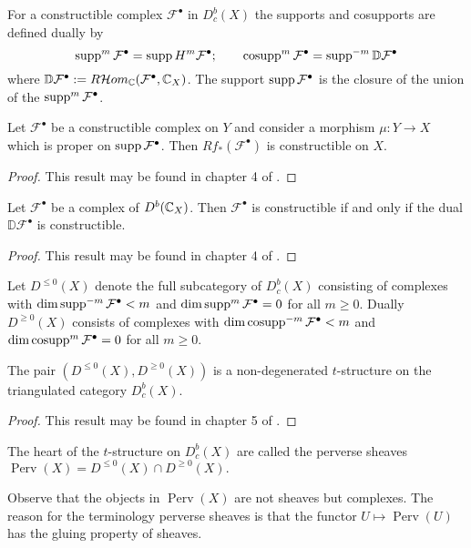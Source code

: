   For a constructible complex $\mathcal{F}^\bullet$ in $D^b_c(X)$ the supports and cosupports are defined dually by
  $$\operatorname{supp}^m\mathcal{F}^\bullet = \operatorname{supp} H^m \mathcal{F}^\bullet; \qquad \operatorname{cosupp}^m\mathcal{F}^\bullet = \operatorname{supp}^{-m}\mathbb{D}\mathcal{F}^\bullet$$
  where $\mathbb{D}\mathcal{F}^\bullet := R \mathcal{H}om_{\mathbb{C}}(\mathcal{F}^\bullet,\mathbb{C}_X)$.
  The support $\operatorname{supp} \mathcal{F}^\bullet$ is the closure of the union of the $\operatorname{supp}^m\mathcal{F}^\bullet$.
  \begin{theorem}
    Let $\mathcal{F}^\bullet$ be a constructible complex on $Y$ and consider a morphism $\mu:Y\to X$ which is proper on $\operatorname{supp} \mathcal{F}^\bullet$. Then $Rf_*(\mathcal{F}^\bullet)$ is constructible on $X$.
  \end{theorem}
  \begin{proof}
    This result may be found in chapter 4 of \cite{dimca2004sheaves}.
  \end{proof}
  \begin{theorem}
    Let $\mathcal{F}^\bullet$ be a complex of $D^b(\mathbb{C}_X)$. Then $\mathcal{F}^\bullet$ is constructible if and only if the dual $\mathbb{D}\mathcal{F}^\bullet$ is constructible.
  \end{theorem}
  \begin{proof}
    This result may be found in chapter 4 of \cite{dimca2004sheaves}.
  \end{proof}
  Let $D^{\leq 0}(X)$ denote the full subcategory of $D^b_c(X)$ consisting of complexes with $\dim \operatorname{supp}^{-m} \mathcal{F}^\bullet < m$ and $\dim \operatorname{supp}^m \mathcal{F}^\bullet = 0$ for all $m\geq 0$.
  Dually $D^{\geq 0}(X)$ consists of complexes with $\dim \operatorname{cosupp}^{-m}\mathcal{F}^\bullet <m$ and $\dim \operatorname{cosupp}^m \mathcal{F}^\bullet = 0$ for all $m\geq 0$.
  \begin{proposition}
    The pair $(D^{\leq 0}(X), D^{\geq 0}(X))$ is a non-degenerated $t$-structure on the triangulated category $D^{b}_c(X)$.
  \end{proposition}
  \begin{proof}
    This result may be found in chapter 5 of \cite{dimca2004sheaves}.
  \end{proof}
  \begin{definition}
    The heart of the $t$-structure on $D^b_c(X)$ are called the perverse sheaves $\operatorname{Perv}(X) = D^{\leq 0}(X)\cap D^{\geq 0}(X).$
  \end{definition}
  Observe that the objects in $\operatorname{Perv}(X)$ are not sheaves but complexes.
  The reason for the terminology perverse sheaves is that the functor $U\mapsto \operatorname{Perv}(U)$ has the gluing property of sheaves.
